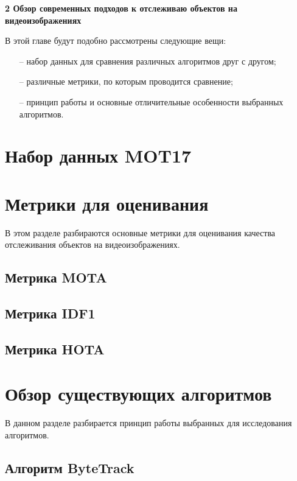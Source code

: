\newpage
\begin{flushleft}
  \textbf{\large 2 Обзор современных подходов к отслеживаю объектов на видеоизображениях}
\end{flushleft}
В этой главе будут подобно рассмотрены следующие вещи:
\begin{itemize}
  \item[--] набор данных для сравнения различных алгоритмов друг с другом;
  \item[--] различные метрики, по которым проводится сравнение;
  \item[--] принцип работы и основные отличительные особенности выбранных алгоритмов. 
\end{itemize}
\section{Набор данных MOT17}

\section{Метрики для оценивания}
В этом разделе разбираются основные метрики для оценивания качества отслеживания объектов на видеоизображениях.
\subsection{Метрика MOTA}

\subsection{Метрика IDF1}

\subsection{Метрика HOTA}


\section{Обзор существующих алгоритмов}
В данном разделе разбирается принцип работы выбранных для исследования алгоритмов.
\subsection{Алгоритм ByteTrack}



